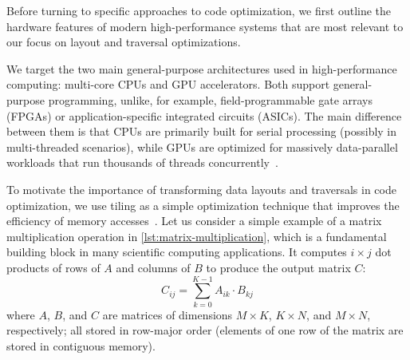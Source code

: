 

Before turning to specific approaches to code optimization, we first outline the hardware features of modern high-performance systems that are most relevant to our focus on layout and traversal optimizations.

We target the two main general-purpose architectures used in high-performance computing: multi-core CPUs and GPU accelerators. Both support general-purpose programming, unlike, for example, field-programmable gate arrays (FPGAs) or application-specific integrated circuits (ASICs). The main difference between them is that CPUs are primarily built for serial processing (possibly in multi-threaded scenarios), while GPUs are optimized for massively data-parallel workloads that run thousands of threads concurrently~\cite{hennessy2019computer,cuda_programming_guide}.



To motivate the importance of transforming data layouts and traversals in code optimization, we use tiling as a simple optimization technique that improves the efficiency of memory accesses~\cite{allen2001optimizing}.
Let us consider a simple example of a matrix multiplication operation in \cref{lst:matrix-multiplication}, which is a fundamental building block in many scientific computing applications. It computes $i \times j$ dot products of rows of $A$ and columns of $B$ to produce the output matrix $C$:
\[C_{ij} = \sum\limits_{k=0}^{K-1} A_{ik} \cdot B_{kj}\]
where $A$, $B$, and $C$ are matrices of dimensions $M \times K$, $K \times N$, and $M \times N$, respectively; all stored in row-major order (elements of one row of the matrix are stored in contiguous memory).

